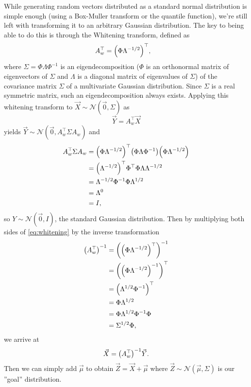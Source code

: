 \documentclass[headings=optiontoheadandtoc,listof=totoc,parskip=full]{scrartcl}
\begin{document}
While generating random vectors distributed as a standard normal distribution is simple enough (using a Box-Muller transform or the quantile function), we're still left with transforming it to an arbitrary Gaussian distribution. The key to being able to do this is through the Whitening transform, defined as
\begin{align}
	A_w^\top &= \qty(\Phi \Lambda^{-1/2})^\top,
\end{align}
where $\Sigma = \Phi \Lambda \Phi^{-1}$ is an eigendecomposition ($\Phi$ is an orthonormal matrix of eigenvectors of $\Sigma$ and $\Lambda$ is a diagonal matrix of eigenvalues of $\Sigma$) of the covariance matrix $\Sigma$ of a multivariate Gaussian distribution. Since $\Sigma$ is a real symmetric matrix, such an eigendecomposition always exists. Applying this whitening transform to $\vec X \sim \mathcal N(\vec 0, \Sigma)$ as
\begin{equation}
	\vec Y = A_w^\top \vec X \label{eq:whitening}
\end{equation}
yields $\vec Y \sim \mathcal N(\vec 0, A_w^\top \Sigma A_w)$ and
\begin{align*}
	A_w^\top \Sigma A_w &= \qty(\Phi \Lambda^{-1/2})^\top \qty(\Phi \Lambda \Phi^{-1}) \qty(\Phi \Lambda^{-1/2})\\
		&= \qty(\Lambda^{-1/2})^\top \Phi^\top \Phi \Lambda \Lambda^{-1/2}\\
		&= \Lambda^{-1/2} \Phi^{-1} \Phi \Lambda^{1/2}\\
		&= \Lambda^0\\
		&= I,
\end{align*}
so $Y \sim \mathcal N(\vec 0, I)$, the standard Gaussian distribution. Then by multiplying both sides of \cref{eq:whitening} by the inverse transformation
\begin{equation}
	\begin{split}
		\qty(A_w^\top)^{-1} &= \qty(\qty(\Phi \Lambda^{-1/2})^\top)^{-1}\\
			&= \qty(\qty(\Phi \Lambda^{-1/2})^{-1})^\top\\
			&= \qty(\Lambda^{1/2}\Phi^{-1})^\top\\
			&= \Phi\Lambda^{1/2}\\
			&= \Phi\Lambda^{1/2}\Phi^{-1}\Phi\\
			&= \Sigma^{1/2}\Phi, \label{eq:inverse-whitening}
	\end{split}
\end{equation}
we arrive at
\begin{equation}
	\vec X = \qty(A_w^\top)^{-1} \vec Y.
\end{equation}
Then we can simply add $\vec \mu$ to obtain $\vec Z = \vec X + \vec \mu$ where $\vec Z \sim \mathcal N(\vec \mu, \Sigma)$ is our ''goal'' distribution.
\end{document}
